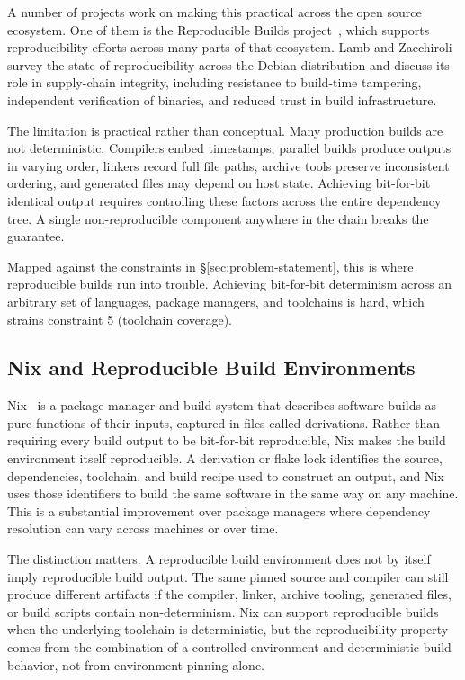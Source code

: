 \documentclass[11pt]{article}
\begin{document}
A number of projects work on making this practical across the open source ecosystem. One of them is the Reproducible Builds project~\cite{ref:reproducible-builds}, which supports reproducibility efforts across many parts of that ecosystem. Lamb and Zacchiroli~\cite{ref:lamb-zacchiroli} survey the state of reproducibility across the Debian distribution and discuss its role in supply-chain integrity, including resistance to build-time tampering, independent verification of binaries, and reduced trust in build infrastructure.

The limitation is practical rather than conceptual. Many production builds are not deterministic. Compilers embed timestamps, parallel builds produce outputs in varying order, linkers record full file paths, archive tools preserve inconsistent ordering, and generated files may depend on host state. Achieving bit-for-bit identical output requires controlling these factors across the entire dependency tree. A single non-reproducible component anywhere in the chain breaks the guarantee.

Mapped against the constraints in \S\ref{sec:problem-statement}, this is where reproducible builds run into trouble. Achieving bit-for-bit determinism across an arbitrary set of languages, package managers, and toolchains is hard, which strains constraint 5 (toolchain coverage).

\subsection{Nix and Reproducible Build Environments}

Nix~\cite{ref:nix} is a package manager and build system that describes software builds as pure functions of their inputs, captured in files called derivations. Rather than requiring every build output to be bit-for-bit reproducible, Nix makes the build environment itself reproducible. A derivation or flake lock identifies the source, dependencies, toolchain, and build recipe used to construct an output, and Nix uses those identifiers to build the same software in the same way on any machine. This is a substantial improvement over package managers where dependency resolution can vary across machines or over time.

The distinction matters. A reproducible build environment does not by itself imply reproducible build output. The same pinned source and compiler can still produce different artifacts if the compiler, linker, archive tooling, generated files, or build scripts contain non-determinism. Nix can support reproducible builds when the underlying toolchain is deterministic, but the reproducibility property comes from the combination of a controlled environment and deterministic build behavior, not from environment pinning alone.
\end{document}
